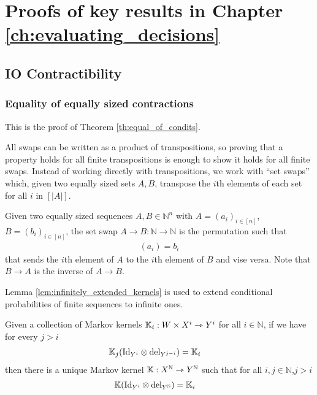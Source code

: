 

\chapter{Proofs of key results in Chapter \ref{ch:evaluating_decisions}} %

\label{AppendixB} %

\section{IO Contractibility}\label{sec:io_contract_proof}

\subsection{Equality of equally sized contractions}

This is the proof of Theorem \ref{th:equal_of_condits}.

All swaps can be written as a product of transpositions, so proving that a property holds for all finite transpositions is enough to show it holds for all finite swaps. Instead of working directly with transpositions, we work with ``set swaps'' which, given two equally sized sets $A,B$, transpose the $i$th elements of each set for all $i$ in $[|A|]$.

\begin{definition}
Given two equally sized sequences $A,B\in \mathbb{N}^n$ with $A=(a_i)_{i\in [n]}$, $B=(b_i)_{i\in [n]}$, the set swap ${A\rightarrow B}:\mathbb{N}\to \mathbb{N}$ is the permutation such that 
\begin{align}
	[A\rightarrow B](a_i) = b_i
\end{align}that sends the $i$th element of $A$ to the $i$th element of $B$ and vise versa. Note that $B\rightarrow A$ is the inverse of $A\rightarrow B$.
\end{definition}

Lemma \ref{lem:infinitely_extended_kernels} is used to extend conditional probabilities of finite sequences to infinite ones. 

\begin{lemma}\label{lem:infinitely_extended_kernels}
Given a collection of Markov kernels $\mathbb{K}_i:W\times X^{i}\rightarrowtriangle Y^i$ for all $i\in \mathbb{N}$, if we have for every $j>i$
\begin{align}
    \mathbb{K}_j(\mathrm{Id}_{Y^i}\otimes \text{del}_{Y^{j-i}}) &= \mathbb{K}_i\label{eqApp:marginalise_comb}
\end{align} 
then there is a unique Markov kernel $\mathbb{K}:X^{\mathbb{N}}\rightarrowtriangle Y^{\mathbb{N}}$ such that for all $i,j\in \mathbb{N}$,$j>i$
\begin{align}
    \mathbb{K}(\mathrm{Id}_{Y^i}\otimes \text{del}_{Y^{\mathbb{N}}})&= \mathbb{K}_i
\end{align}
\end{lemma}

